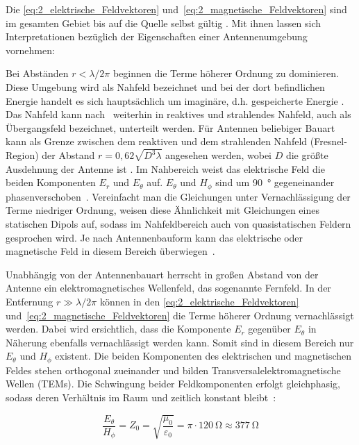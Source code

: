 Die \Gleichungen\eqref{eq:2_elektrische_Feldvektoren} und~\eqref{eq:2_magnetische_Feldvektoren} sind im gesamten Gebiet bis auf die Quelle selbst gültig \cite{Antenna_Theory}. Mit ihnen lassen sich Interpretationen bezüglich der Eigenschaften einer Antennenumgebung vornehmen:
\par
\vspace{\linespace}
Bei Abständen $r< \lambda / 2\pi$ beginnen die Terme höherer Ordnung zu dominieren. Diese Umgebung wird als Nahfeld bezeichnet und bei der dort befindlichen Energie handelt es sich hauptsächlich um imaginäre, d.h. gespeicherte Energie \cite{Antenna_Theory}. Das Nahfeld kann nach~\cite{Bundesnetzagentur_Glossar_Nahfeld} weiterhin in reaktives und strahlendes Nahfeld, auch als Übergangsfeld bezeichnet, unterteilt werden. Für Antennen beliebiger Bauart kann als Grenze zwischen dem reaktiven und dem strahlenden Nahfeld (Fresnel-Region) der Abstand \mbox{$r=0,62 \sqrt{D^3\lambda}$} angesehen werden, wobei $D$ die größte Ausdehnung der Antenne ist \cite{Antenna_Theory}. Im Nahbereich weist das elektrische Feld die beiden Komponenten $E_r$ und $E_{\theta}$ auf. $E_\theta$ und $H_\phi$ sind um \SI{90}{\degree} gegeneinander phasenverschoben~\cite{EM_Schirmung}. Vereinfacht man die Gleichungen unter Vernachlässigung der Terme niedriger Ordnung, weisen diese Ähnlichkeit mit Gleichungen eines statischen Dipols auf, sodass im Nahfeldbereich auch von quasistatischen Feldern gesprochen wird. Je nach Antennenbauform kann das elektrische oder magnetische Feld in diesem Bereich überwiegen~\cite{EMV}. 
\par
\vspace{\linespace}
Unabhängig von der Antennenbauart herrscht in großen Abstand von der Antenne ein elektromagnetisches Wellenfeld, das sogenannte Fernfeld. In der Entfernung $r\gg \lambda / 2\pi$ können in den \Gleichungen\eqref{eq:2_elektrische_Feldvektoren} und~\eqref{eq:2_magnetische_Feldvektoren} die Terme höherer Ordnung vernachlässigt werden. Dabei wird ersichtlich, dass die Komponente $E_r$ gegenüber $E_\theta$ in Näherung ebenfalls vernachlässigt werden kann. Somit sind in diesem Bereich nur $E_\theta$ und $H_\phi$ existent. Die beiden Komponenten des elektrischen und magnetischen Feldes stehen orthogonal zueinander und bilden Transversalelektromagnetische Wellen (TEMs). Die Schwingung beider Feldkomponenten erfolgt gleichphasig, sodass deren Verhältnis im Raum und zeitlich konstant bleibt~\cite{EMV}:

\begin{equation}
    \frac{E_{\theta}}{H_{\phi}} = Z_0 = \sqrt{\frac{\mu_0}{\varepsilon_0}} = \pi \cdot \SI{120}{\ohm} \approx \SI{377}{\ohm}
\end{equation}

